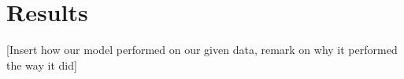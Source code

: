 \section{Results}
\label{sec:results}
[Insert how our model performed on our given data, remark on why it performed the way it did]


